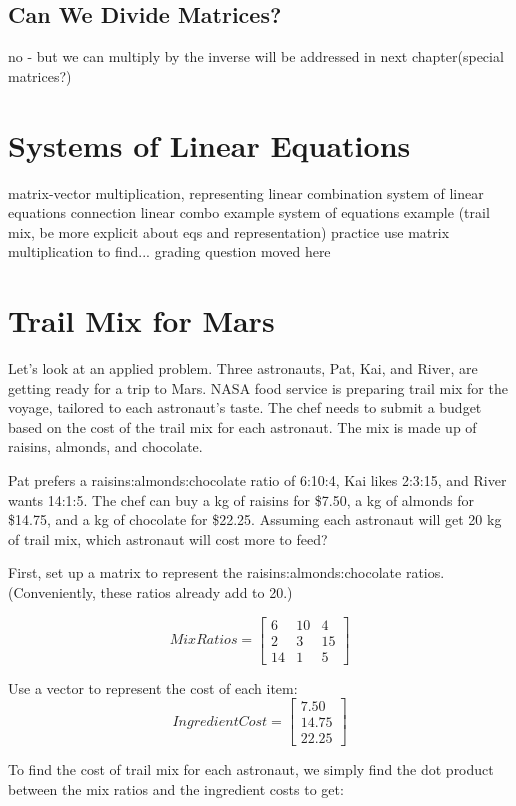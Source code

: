 \subsection{Can We Divide Matrices?}
no - but we can multiply by the inverse
will be addressed in next chapter(special matrices?)
\section{Systems of Linear Equations}
matrix-vector multiplication, representing linear combination
system of linear equations connection
linear combo example
system of equations example (trail mix, be more explicit about eqs and representation)
practice
	use matrix multiplication to find...
	grading question moved here

\section{Trail Mix for Mars}
Let's look at an applied problem. Three astronauts, Pat, Kai, and River, are getting ready for a trip to Mars. NASA food service is preparing trail mix for the voyage, tailored to each astronaut's taste. The chef needs to submit a budget based on the cost of the trail mix for each astronaut. The mix is made up of raisins, almonds, and chocolate.

Pat prefers a raisins:almonds:chocolate ratio of 6:10:4, Kai likes 2:3:15, and River wants 14:1:5. The chef can buy a kg of raisins for \$7.50, a kg of almonds for \$14.75, and a kg of chocolate for \$22.25. Assuming each astronaut will get 20 kg of trail mix, which astronaut will cost more to feed?

First, set up a matrix to represent the raisins:almonds:chocolate ratios. (Conveniently, these ratios already add to 20.)

$$MixRatios = \begin{bmatrix}
6 & 10 & 4  \\
2 & 3 & 15 \\
14 & 1 & 5
\end{bmatrix}$$

Use a vector to represent the cost of each item:
$$IngredientCost = 
\begin{bmatrix}
7.50 \\
14.75 \\
22.25
\end{bmatrix}$$

To find the cost of trail mix for each astronaut, we simply find the dot product between the mix ratios and the ingredient costs to get:

